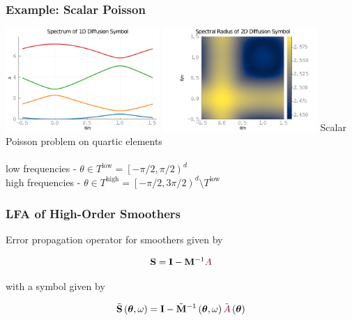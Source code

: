 \documentclass{beamer}
\begin{document}
\begin{frame}
\begin{center}
\frametitle{Example: Scalar Poisson}

\includegraphics[height=3.9cm]{../img/diffusionSymbol1D}
\includegraphics[height=3.9cm]{../img/diffusionSymbol2D}
{\small Scalar Poisson problem on quartic elements}\\

~\\

low frequencies - $\theta \in T^{\text{low}} = \left[ - \pi / 2, \pi / 2 \right)^d$\\

high frequencies - $\theta \in T^{\text{high}} = \left[ - \pi / 2, 3 \pi / 2 \right)^d \setminus T^{\text{low}}$

\end{center}
\end{frame}


\begin{frame}
\begin{center}
\frametitle{LFA of High-Order Smoothers}

Error propagation operator for smoothers given by

\begin{equation}
\mathbf{S} = \mathbf{I} - \mathbf{M}^{-1} {\color{burgundy}A}
\end{equation}

with a symbol given by

\begin{equation}
\tilde{\mathbf{S}} \left( \boldsymbol{\theta}, \omega \right) = \mathbf{I} - \tilde{\mathbf{M}}^{-1} \left( \boldsymbol{\theta}, \omega \right) \tilde{{\color{burgundy}A}} \left( \boldsymbol{\theta} \right)
\end{equation}

\end{center}
\end{frame}
\end{document}
